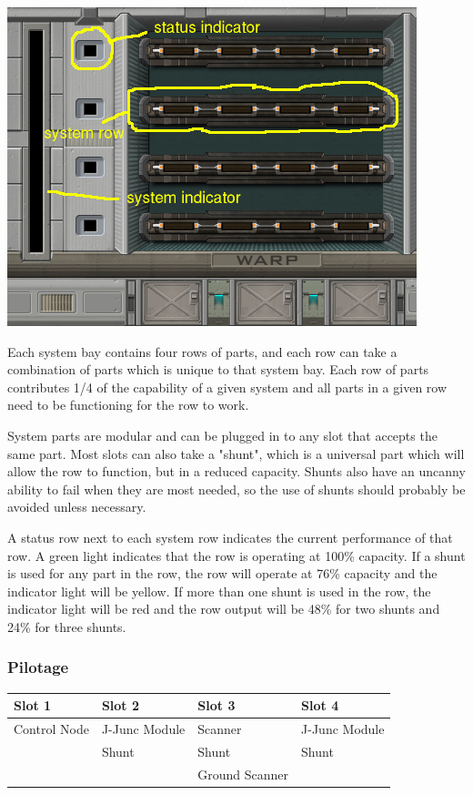 \begin{itemize}
\includegraphics[scale=0.70]{images/interior-warp.png}

Each system bay contains four rows of parts, and each row can take a
combination of parts which is unique to that system bay.  Each row of
parts contributes 1/4 of the capability of a given system and all parts
in a given row need to be functioning for the row to work.

System parts are modular and can be plugged in to any slot that accepts the
same part.  Most slots can also take a "shunt", which is a universal part
which will allow the row to function, but in a reduced capacity.  Shunts
also have an uncanny ability to fail when they are most needed, so the use
of shunts should probably be avoided unless necessary.

A status row next to each system row indicates the current performance
of that row.  A green light indicates that the row is operating at
100\% capacity.  If a shunt is used for any part in the row, the row will
operate at 76\% capacity and the indicator light will be yellow.  If
more than one shunt is used in the row, the indicator light will be red
and the row output will be 48\% for two shunts and 24\% for three shunts.

\subsubsection{Pilotage}

\begin{tabular}{ | p{2.5cm} | p{2.5cm} | p{2.5cm} | p{2.5cm} | }
\hline
Slot 1 & Slot 2 & Slot 3 & Slot 4 \\ \hline
Control Node & J-Junc Module & Scanner & J-Junc Module \\
& Shunt & Shunt & Shunt \\
& & Ground Scanner & \\
\hline
\end{tabular}


\end{itemize}
